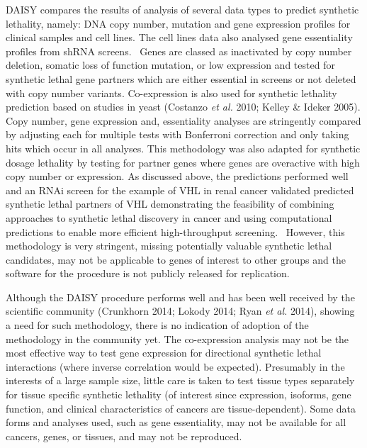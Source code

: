 DAISY compares the results of analysis of several data types to predict
synthetic lethality, namely: DNA copy number, mutation and gene
expression profiles for clinical samples and cell lines. The cell
lines data also analysed gene essentiality profiles from shRNA screens.
\ Genes are classed as inactivated by copy number deletion, somatic
loss of function mutation, or low expression and tested for synthetic
lethal gene partners which are either essential in screens or not
deleted with copy number variants. Co-expression is also used for
synthetic lethality prediction based on studies in yeast
(Costanzo\textit{ et al.} 2010; Kelley \& Ideker 2005). Copy number,
gene expression and, essentiality analyses are stringently compared by
adjusting each for multiple tests with Bonferroni correction and only
taking hits which occur in all analyses. This methodology was also
adapted for synthetic dosage lethality by testing for partner genes
where genes are overactive with high copy number or expression. As
discussed above, the predictions performed well and an RNAi screen for
the example of VHL in renal cancer validated predicted synthetic lethal
partners of VHL demonstrating the feasibility of combining approaches
to synthetic lethal discovery in cancer and using computational
predictions to enable more efficient high-throughput screening.
\ However, this methodology is very stringent, missing potentially
valuable synthetic lethal candidates, may not be applicable to genes of
interest to other groups and the software for the procedure is not
publicly released for replication. 


Although the DAISY procedure performs well and has been well received by
the scientific community (Crunkhorn 2014; Lokody 2014; Ryan\textit{ et
al.} 2014), showing a need for such methodology, there is no indication
of adoption of the methodology in the community yet. The
co-expression analysis may not be the most effective way to test gene
expression for directional synthetic lethal interactions (where inverse
correlation would be expected). Presumably in the interests of a
large sample size, little care is taken to test tissue types separately
for tissue specific synthetic lethality (of interest since expression,
isoforms, gene function, and clinical characteristics of cancers are
tissue-dependent). Some data forms and analyses used, such as gene
essentiality, may not be available for all cancers, genes, or tissues,
and may not be reproduced. 


